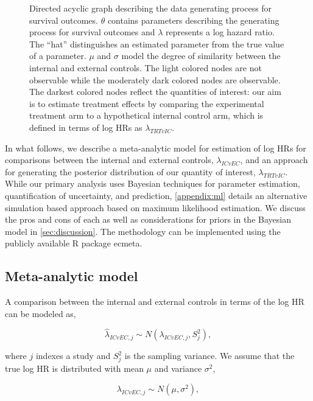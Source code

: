 \documentclass[11pt,final,fleqn]{article}\usepackage[]{graphicx}\usepackage[]{color}
\newcommand{\pkg}[1]{{\fontseries{m}\fontseries{b}\selectfont #1}}
\begin{document}
\begin{figure}[t!]
\begin{subfigure}[b]{\textwidth}
\end{subfigure}
\caption{Directed acyclic graph describing the data generating process for survival outcomes. $\theta$ contains parameters describing the generating process for survival outcomes and $\lambda$ represents a log hazard ratio. The ``hat'' distinguishes an estimated parameter from the true value of a parameter. $\mu$ and $\sigma$ model the degree of similarity between the internal and external controls. The light colored nodes are not observable while the moderately dark colored nodes are observable. The darkest colored nodes reflect the quantities of interest: our aim is to estimate treatment effects by comparing the experimental treatment arm to a hypothetical internal control arm, which is defined in terms of log HRs as $\lambda_{TRTvIC}$.}
\label{fig:dag}
\end{figure}

In what follows, we describe a meta-analytic model for estimation of log HRs for comparisons between the internal and external controls, $\lambda_{ICvEC}$, and an approach for generating the posterior distribution of our quantity of interest, $\lambda_{\textit{TRT}vIC}$. While our primary analysis uses Bayesian techniques for parameter estimation, quantification of uncertainty, and prediction, \autoref{appendix:ml} details an alternative simulation based approach based on maximum likelihood estimation. We discuss the pros and cons of each as well as considerations for priors in the Bayesian model in \autoref{sec:discussion}. The methodology can be implemented using the publicly available \textsf{R} package \pkg{ecmeta}.

\subsection{Meta-analytic model} \label{subsec:meta-analytic}
A comparison between the internal and external controls in terms of the log HR can be modeled as,

\begin{equation}
\hat\lambda_{ICvEC,j} \sim N (\lambda_{ICvEC,j}, S_j^2),
\end{equation}

where $j$ indexes a study and $S_j^2$ is the sampling variance. We assume that the true log HR is distributed with mean $\mu$ and variance $\sigma^2$, 

\begin{equation}
\lambda_{ICvEC,j} \sim N ( \mu , \sigma^2),
\end{equation}
\end{document}
